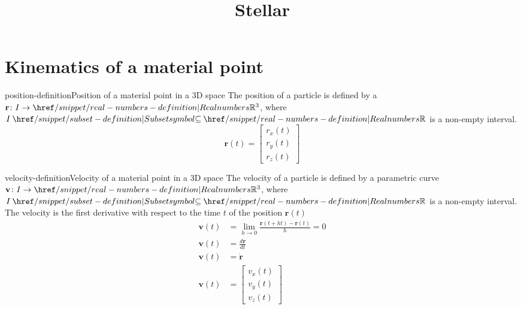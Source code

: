 \documentclass[preview]{standalone}
\begin{document}
\title{Stellar}
\genpage

\section{Kinematics of a material point}


\begin{snippetdefinition}{position-definition}{Position of a material point in a 3D space}
    The position of a particle is defined by a  $\mathbf{r} \colon I \to \realnumbers^3 $, where $I \subseteq \realnumbers$ is a non-empty interval.
    \[
        \mathbf{r}(t) = \begin{bmatrix}
            r_x(t) \\ r_y(t) \\ r_z(t)
        \end{bmatrix} 
    \] 
\end{snippetdefinition}


\begin{snippetdefinition}{velocity-definition}{Velocity of a material point in a 3D space}
    The velocity of a particle is defined by a parametric curve $\mathbf{v} \colon I \to \realnumbers^3 $, where $I \subseteq \realnumbers$ is a non-empty interval. \\
    The velocity is the first derivative with respect to the time $t$ of the position $\mathbf{r}(t)$ 
    \begin{align*}
        \mathbf{v}(t) &= \lim_{h \to 0} \frac{\mathbf{r}(t + ht) - \mathbf{r}(t)}{h} = 0 \\
        \mathbf{v}(t) &= \frac{d\mathbf{r}}{dt} \\
        \mathbf{v}(t) &= \dot{\mathbf{r}} \\
        \mathbf{v}(t) &= \begin{bmatrix}
            v_x(t) \\ v_y(t) \\ v_z(t)
        \end{bmatrix}
    \end{align*}
\end{snippetdefinition}

\end{document}
